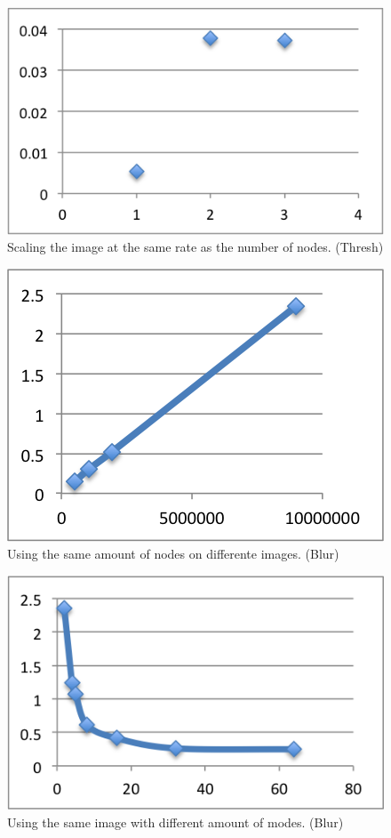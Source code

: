 \documentclass[a4paper]{article}
\begin{document}
\begin{figure}
  \centering
  \includegraphics{samescale.png}
  \caption{Scaling the image at the same rate as the number of nodes. (Thresh)}
  \label{tab:fig3}
\end{figure}

\begin{figure}
  \centering
  \includegraphics{sameProcessorBlur.png}
  \caption{Using the same amount of nodes on differente images. (Blur)}
  \label{tab:fig4}
\end{figure}

\begin{figure}
  \centering
  \includegraphics{samePixelsBlur.png}
  \caption{Using the same image with different amount of modes. (Blur)}
  \label{tab:fig5}
\end{figure}
\end{document}
